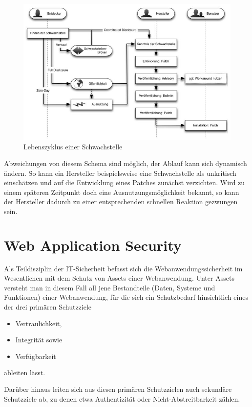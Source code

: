 \documentclass[12pt,oneside,a4paper,parskip]{scrbook}
\begin{document}
  \begin{figure}[H]
    \centering
     \includegraphics[width=1\textwidth]{Images/Lebenszyklus}
    \caption[Lebenszyklus einer Schwachstelle]{Lebenszyklus einer Schwachstelle \cite{BSI3}}
  \end{figure}

  Abweichungen von diesem Schema sind möglich, der Ablauf kann sich dynamisch ändern. So
  kann ein Hersteller beispielsweise eine Schwachstelle als unkritisch einschätzen und auf die
  Entwicklung eines Patches zunächst verzichten. Wird zu einem späteren Zeitpunkt doch eine
  Ausnutzungsmöglichkeit bekannt, so kann der Hersteller dadurch zu einer entsprechenden
  schnellen Reaktion gezwungen sein. \cite{BSI3}
  \newpage

  \section{Web Application Security}
  Als Teildisziplin der IT-Sicherheit befasst sich die Webanwendungssicherheit im Wesentlichen mit dem
  Schutz von Assets einer Webanwendung. Unter Assets versteht man in diesem Fall all jene Bestandteile
  (Daten, Systeme und Funktionen) einer Webanwendung, für die sich ein Schutzbedarf hinsichtlich eines der
  drei primären Schutzziele
  \begin{itemize}
    \item Vertraulichkeit,
    \item Integrität sowie
    \item Verfügbarkeit
  \end{itemize}
  ableiten lässt.

  Darüber hinaus leiten sich aus diesen primären Schutzzielen auch sekundäre Schutzziele ab, zu denen etwa
  Authentizität oder Nicht-Abstreitbarkeit zählen.
\end{document}
